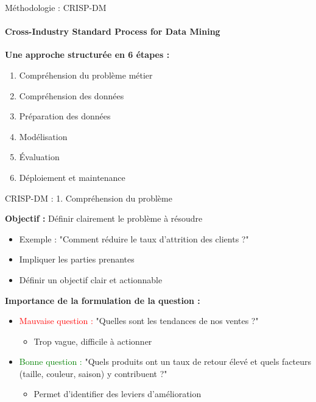 \begin{frame}{Méthodologie : CRISP-DM}
\framesubtitle{Cross-Industry Standard Process for Data Mining}

\textbf{Une approche structurée en 6 étapes :}

\vspace{0.3cm}

\begin{enumerate}
    \item Compréhension du problème métier
    \item Compréhension des données
    \item Préparation des données
    \item Modélisation
    \item Évaluation
    \item Déploiement et maintenance
\end{enumerate}

\end{frame}

\begin{frame}{CRISP-DM : 1. Compréhension du problème}

\textbf{Objectif :} Définir clairement le problème à résoudre

\vspace{0.3cm}

\begin{itemize}
    \item Exemple : "Comment réduire le taux d'attrition des clients ?"
    \item Impliquer les parties prenantes
    \item Définir un objectif clair et actionnable
\end{itemize}

\vspace{0.5cm}

\textbf{Importance de la formulation de la question :}

\vspace{0.2cm}

\begin{itemize}
    \item \textcolor{red}{Mauvaise question :} "Quelles sont les tendances de nos ventes ?"
        \begin{itemize}
            \item Trop vague, difficile à actionner
        \end{itemize}
    \item \textcolor{green}{Bonne question :} "Quels produits ont un taux de retour élevé et quels facteurs (taille, couleur, saison) y contribuent ?"
        \begin{itemize}
            \item Permet d'identifier des leviers d'amélioration
        \end{itemize}
\end{itemize}

\end{frame}

